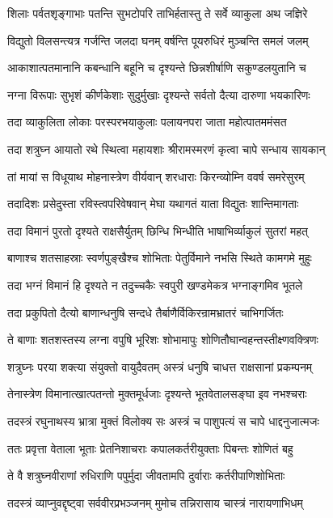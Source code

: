 \twolineshloka
{शिलाः पर्वतशृङ्गाभाः पतन्ति सुभटोपरि}
{ताभिर्हतास्तु ते सर्वे व्याकुला अथ जज्ञिरे}%

\twolineshloka
{विद्युतो विलसन्त्यत्र गर्जन्ति जलदा घनम्}
{वर्षन्ति पूयरुधिरं मुञ्चन्ति समलं जलम्}%

\twolineshloka
{आकाशात्पतमानानि कबन्धानि बहूनि च}
{दृश्यन्ते छिन्नशीर्षाणि सकुण्डलयुतानि च}%

\twolineshloka
{नग्ना विरूपाः सुभृशं कीर्णकेशाः सुदुर्मुखाः}
{दृश्यन्ते सर्वतो दैत्या दारुणा भयकारिणः}%

\twolineshloka
{तदा व्याकुलिता लोकाः परस्परभयाकुलाः}
{पलायनपरा जाता महोत्पातममंसत}%

\twolineshloka
{तदा शत्रुघ्न आयातो रथे स्थित्वा महायशाः}
{श्रीरामस्मरणं कृत्वा चापे सन्धाय सायकान्}%

\twolineshloka
{तां मायां स विधूयाथ मोहनास्त्रेण वीर्यवान्}
{शरधाराः किरन्व्योम्नि ववर्ष समरेसुरम्}%

\twolineshloka
{तदादिशः प्रसेदुस्ता रविस्त्वपरिवेषवान्}
{मेघा यथागतं याता विद्युतः शान्तिमागताः}%

\twolineshloka
{तदा विमानं पुरतो दृश्यते राक्षसैर्युतम्}
{छिन्धि भिन्धीति भाषाभिर्व्याकुलं सुतरां महत्}%

\twolineshloka
{बाणाश्च शतसाहस्राः स्वर्णपुङ्खैश्च शोभिताः}
{पेतुर्विमाने नभसि स्थिते कामगमे मुहुः}%

\twolineshloka
{तदा भग्नं विमानं हि दृश्यते न तदुच्चकैः}
{स्वपुरी खण्डमेकत्र भग्नाङ्गमिव भूतले}%

\twolineshloka
{तदा प्रकुपितो दैत्यो बाणान्धनुषि सन्दधे}
{तैर्बाणैर्विकिरन्रामभ्रातरं चाभिगर्जितः}%

\twolineshloka
{ते बाणाः शतशस्तस्य लग्ना वपुषि भूरिशः}
{शोभामापुः शोणितौघान्वहन्तस्तीक्ष्णवक्त्रिणः}%

\twolineshloka
{शत्रुघ्नः परया शक्त्या संयुक्तो वायुदैवतम्}
{अस्त्रं धनुषि चाधत्त राक्षसानां प्रकम्पनम्}%

\twolineshloka
{तेनास्त्रेण विमानात्खात्पतन्तो मुक्तमूर्धजाः}
{दृश्यन्ते भूतवेतालसङ्घा इव नभश्चराः}%

\twolineshloka
{तदस्त्रं रघुनाथस्य भ्रात्रा मुक्तं विलोक्य सः}
{अस्त्रं च पाशुपत्यं स चापे धाद्दनुजात्मजः}%

\twolineshloka
{ततः प्रवृत्ता वेताला भूताः प्रेतनिशाचराः}
{कपालकर्तरीयुक्ताः पिबन्तः शोणितं बहु}%

\twolineshloka
{ते वै शत्रुघ्नवीराणां रुधिराणि पपुर्मुदा}
{जीवतामपि दुर्वाराः कर्तरीपाणिशोभिताः}%

\twolineshloka
{तदस्त्रं व्याप्नुवद्दृष्ट्वा सर्ववीरप्रभञ्जनम्}
{मुमोच तन्निरासाय चास्त्रं नारायणाभिधम्}%

